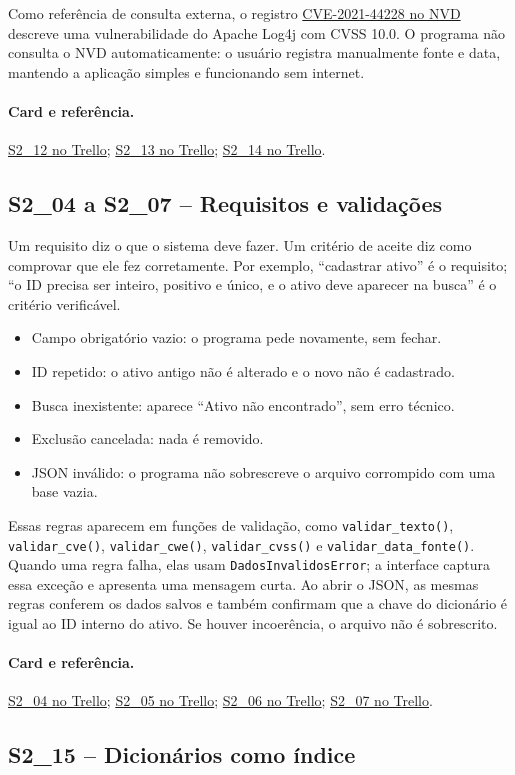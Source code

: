 \documentclass[11pt,a4paper]{article}
\newcommand{\referencia}[2]{\paragraph{Card e referência.}\href{#1}{#2}}
\newcommand{\cardsection}[1]{\Needspace{12\baselineskip}\subsection{#1}}
\begin{document}
Como referência de consulta externa, o registro \href{https://nvd.nist.gov/vuln/detail/CVE-2021-44228}{CVE-2021-44228 no NVD} descreve uma vulnerabilidade do Apache Log4j com CVSS 10.0. O programa não consulta o NVD automaticamente: o usuário registra manualmente fonte e data, mantendo a aplicação simples e funcionando sem internet.

\referencia{https://trello.com/c/zzyFLROU}{S2\_12 no Trello}; \href{https://trello.com/c/xMcbgbvn}{S2\_13 no Trello}; \href{https://trello.com/c/XFF3yzHz}{S2\_14 no Trello}.

\cardsection{S2\_04 a S2\_07 -- Requisitos e validações}

Um requisito diz o que o sistema deve fazer. Um critério de aceite diz como comprovar que ele fez corretamente. Por exemplo, ``cadastrar ativo'' é o requisito; ``o ID precisa ser inteiro, positivo e único, e o ativo deve aparecer na busca'' é o critério verificável.

\begin{itemize}
  \item Campo obrigatório vazio: o programa pede novamente, sem fechar.
  \item ID repetido: o ativo antigo não é alterado e o novo não é cadastrado.
  \item Busca inexistente: aparece ``Ativo não encontrado'', sem erro técnico.
  \item Exclusão cancelada: nada é removido.
  \item JSON inválido: o programa não sobrescreve o arquivo corrompido com uma base vazia.
\end{itemize}

Essas regras aparecem em funções de validação, como \texttt{validar\_texto()}, \texttt{validar\_cve()}, \texttt{validar\_cwe()}, \texttt{validar\_cvss()} e \texttt{validar\_data\_fonte()}. Quando uma regra falha, elas usam \texttt{DadosInvalidosError}; a interface captura essa exceção e apresenta uma mensagem curta. Ao abrir o JSON, as mesmas regras conferem os dados salvos e também confirmam que a chave do dicionário é igual ao ID interno do ativo. Se houver incoerência, o arquivo não é sobrescrito.

\referencia{https://trello.com/c/NcSDMJuv}{S2\_04 no Trello}; \href{https://trello.com/c/YSC57Mjy}{S2\_05 no Trello}; \href{https://trello.com/c/5beR1TIT}{S2\_06 no Trello}; \href{https://trello.com/c/Vs045ALu}{S2\_07 no Trello}.

\cardsection{S2\_15 -- Dicionários como índice}
\end{document}
